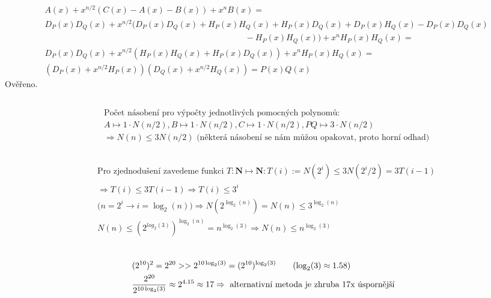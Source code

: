 \documentclass[a4paper]{article}
\begin{document}
\subsection{}
\begin{align*}
	& A(x) + x^{n/2}(C(x)-A(x)-B(x)) + x^nB(x) = \\
	& D_P(x)D_Q(x) + x^{n/2} ( D_P(x)D_Q(x) + H_P(x)H_Q(x) + H_P(x)D_Q(x)+D_P(x)H_Q(x) -  D_P(x)D_Q(x) \\
	& \hspace{10cm} - H_P(x)H_Q(x)) + x^nH_P(x)H_Q(x) = \\
	& D_P(x)D_Q(x) + x^{n/2} (H_P(x)H_Q(x) + H_P(x)D_Q(x)) + x^nH_P(x)H_Q(x) =\\
	& (D_P(x) + x^{n/2}H_P(x))(D_Q(x) + x^{n/2}H_Q(x)) =  P(x) Q(x)
\end{align*}
Ověřeno.

\subsection{}
\begin{align*}
	& \text{Počet násobení pro výpočty jednotlivých pomocných polynomů: } \\
	& A \mapsto 1 \cdot N(n/2), B \mapsto 1 \cdot N(n/2), C \mapsto 1 \cdot  N(n/2), PQ \mapsto 3\cdot N(n/2) \\
	& \Rightarrow N(n) \le 3 N(n/2) \text{ (některá násobení se nám můžou opakovat, proto horní odhad)}
\end{align*}

\subsection{}
\begin{align*}
	& \text{Pro zjednodušení zavedeme funkci } T: \mathbf{N} \mapsto \mathbf{N}: T(i) := N(2^i) \le 3 N(2^i/2) = 3T(i-1) \\
	& \Rightarrow T(i) \le 3 T(i-1) \Rightarrow T(i) \le 3^i \\
	& \big( n = 2^i \rightarrow i = \log_2(n) \big) \Rightarrow N(2^{\log_2(n)}) = N(n) \le 3^{\log_2(n)} \\
	& N(n) \le (2^{log_2(3)})^{\log_2(n)} = n^{\log_2(3)} \Rightarrow N(n) \le n^{\log_2(3)} \\
\end{align*}

\subsection{}
\begin{align*}
	& (2^{10})^2 = 2^{20} >> 2^{10 \log_2(3)} = (2^{10})^{\log_2(3)} \hspace{0.7cm} (\log_2(3) \approx 1.58) \\
	& \frac{2^{20}}{2^{10 \log_2(3)}} \approx 2^{4.15} \approx 17 \Rightarrow \text{ alternativní metoda je zhruba $17$x úspornější}
\end{align*}
\end{document}

